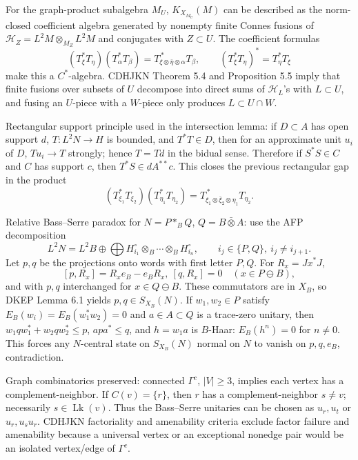 \documentclass{article}
\DeclareMathOperator{\Lk}{Lk}
\begin{document}
For the graph-product subalgebra \(M_U\), \(K_{X_{M_U}}(M)\) can be described
as the norm-closed coefficient algebra generated by nonempty finite Connes
fusions of \(\mathcal H_Z=L^2M\otimes_{M_Z}L^2M\) and conjugates with
\(Z\subset U\).  The coefficient formulas
\[
  (T_\xi^*T_\eta)(T_\alpha^*T_\beta)
    =T_{\xi\otimes\bar\eta\otimes\alpha}^{\,*}T_\beta,\qquad
  (T_\xi^*T_\eta)^*=T_\eta^*T_\xi
\]
make this a \(C^*\)-algebra.  CDHJKN Theorem 5.4 and Proposition 5.5 imply that
finite fusions over subsets of \(U\) decompose into direct sums of
\(\mathcal H_L\)'s with \(L\subset U\), and fusing an \(U\)-piece with a
\(W\)-piece only produces \(L\subset U\cap W\).

Rectangular support principle used in the intersection lemma: if \(D\subset A\)
has open support \(d\), \(T:L^2N\to H\) is bounded, and \(T^*T\in D\), then for
an approximate unit \(u_i\) of \(D\), \(Tu_i\to T\) strongly; hence \(T=Td\) in
the bidual sense.  Therefore if \(S^*S\in C\) and \(C\) has support \(c\), then
\(T^*S\in dA^{**}c\).  This closes the previous rectangular gap in the product
\[
 (T_{\xi_1}^*T_{\xi_2})(T_{\eta_1}^*T_{\eta_2})
 =
 T_{\xi_1\otimes\bar\xi_2\otimes\eta_1}^{\,*}T_{\eta_2}.
\]

Relative Bass--Serre paradox for \(N=P*_BQ\), \(Q=B\bar\otimes A\): use the
AFP decomposition
\[
L^2N=L^2B\oplus\bigoplus H_{i_1}^\circ\otimes_B\cdots\otimes_B H_{i_n}^\circ,
\qquad i_j\in\{P,Q\},\ i_j\ne i_{j+1}.
\]
Let \(p,q\) be the projections onto words with first letter \(P,Q\).  For
\(R_x=Jx^*J\),
\[
 [p,R_x]=R_xe_B-e_BR_x,\ [q,R_x]=0\quad (x\in P\ominus B),
\]
and with \(p,q\) interchanged for \(x\in Q\ominus B\).  These commutators are in
\(X_B\), so DKEP Lemma 6.1 yields \(p,q\in S_{X_B}(N)\).  If \(w_1,w_2\in P\)
satisfy \(E_B(w_i)=E_B(w_1^*w_2)=0\) and \(a\in A\subset Q\) is a trace-zero
unitary, then \(w_1qw_1^*+w_2qw_2^*\le p\), \(apa^*\le q\), and
\(h=w_1a\) is \(B\)-Haar: \(E_B(h^n)=0\) for \(n\ne0\).  This forces any
\(N\)-central state on \(S_{X_B}(N)\) normal on \(N\) to vanish on
\(p,q,e_B\), contradiction.

Graph combinatorics preserved: connected \(\Gamma^c\), \(|V|\ge3\), implies
each vertex has a complement-neighbor.  If \(C(v)=\{r\}\), then \(r\) has a
complement-neighbor \(s\ne v\); necessarily \(s\in\Lk(v)\).  Thus the
Bass--Serre unitaries can be chosen as \(u_r,u_t\) or \(u_r,u_su_r\).
CDHJKN factoriality and amenability criteria exclude factor failure and
amenability because a universal vertex or an exceptional nonedge pair would be
an isolated vertex/edge of \(\Gamma^c\).
\end{document}
